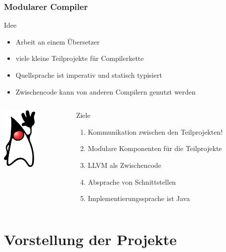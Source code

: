 \documentclass[ucs,9pt]{beamer}
\begin{document}
\begin{frame}
  \frametitle{Modularer Compiler}
  \begin{block}{Idee}
    \begin{itemize}
      \item Arbeit an einem Übersetzer
      \item viele kleine Teilprojekte für Compilerkette
      \item Quellsprache ist imperativ und statisch typisiert
      \item Zwischencode kann von anderen Compilern genutzt werden
    \end{itemize}
  \end{block}

  \begin{columns}
    \begin{column}{0.3\textwidth}
  \begin{center}
    \includegraphics[height=3cm]{java_duke}
  \end{center}
\end{column}
    \begin{column}{0.7\textwidth}
  \begin{block}{Ziele}
    \begin{enumerate}
      \item Kommunikation zwischen den Teilprojekten!
      \item Modulare Komponenten für die Teilprojekte
      \item LLVM als Zwischencode
      \item Absprache von Schnittstellen
      \item Implementierungssprache ist Java
    \end{enumerate}
  \end{block}
\end{column}
  \end{columns}
\end{frame}

\section{Vorstellung der Projekte}
\end{document}
